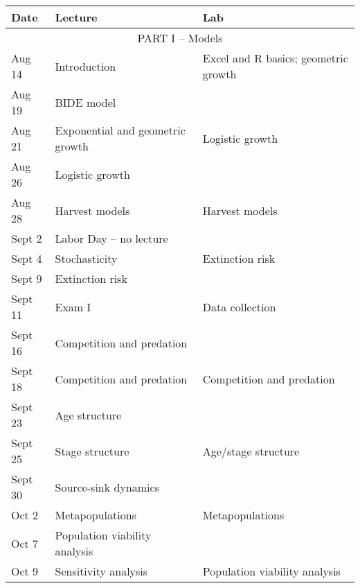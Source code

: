 \documentclass[12pt]{article}
\begin{document}
\begin{center}
\begin{tabular}[c]{lll}
\hline \hline
{\bf Date} & {\bf Lecture}                      & {\bf Lab}                      \\
\hline
           \multicolumn{3}{c}{PART I -- Models}                                        \\
\hline
\hline
Aug 14     & Introduction                       & Excel and R basics; geometric growth \\
\hline
Aug 19     & BIDE model                         &                                      \\
Aug 21     & Exponential and geometric growth   & Logistic growth                      \\
\hline
Aug 26     & Logistic growth                    &                                      \\
Aug 28     & Harvest models                     & Harvest models                       \\
\hline
Sept 2     & Labor Day -- no lecture            &                                      \\
Sept 4     & Stochasticity                      & Extinction risk                      \\
\hline
Sept 9    & Extinction risk                    &                                      \\
Sept 11    & Exam I                             & Data collection                      \\
\hline
Sept 16    & Competition and predation          &                                      \\
Sept 18    & Competition and predation          & Competition and predation            \\
\hline
Sept 23    & Age structure                      &                                      \\
Sept 25    & Stage structure                    & Age/stage structure                  \\
\hline
Sept 30      & Source-sink dynamics               &                                      \\
Oct 2      & Metapopulations                    & Metapopulations                      \\
\hline
Oct 7     & Population viability analysis      &                                      \\
Oct 9     & Sensitivity analysis               & Population viability analysis        \\

\end{tabular}
\end{center}
\end{document}
